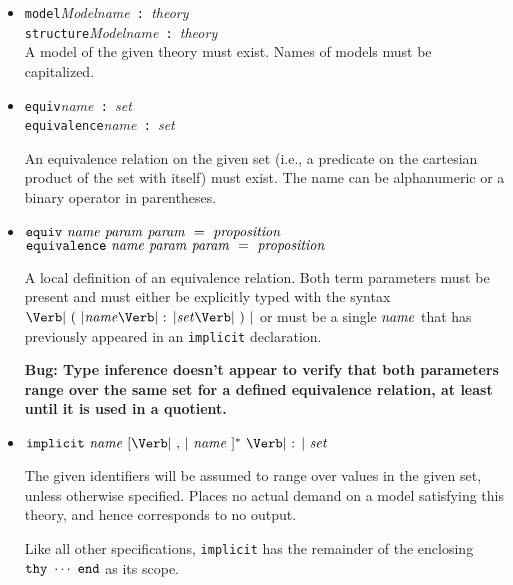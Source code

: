 \documentclass{article}
\newcommand{\keywd}[1]{\mbox{\texttt{#1}}\xspace}
\newcommand{\EQUIV}{\keywd{equiv}}
\newcommand{\EQUIVALENCE}{\keywd{equivalence}}
\newcommand{\END}{\keywd{end}}
\newcommand{\IMPLICIT}{\keywd{implicit}}
\newcommand{\MODEL}{\keywd{model}}
\newcommand{\STRUCTURE}{\keywd{structure}}
\newcommand{\THY}{\keywd{thy}}
\newcommand{\metav}[1]{\mbox{\textit{#1}}\xspace}
\newcommand{\Ident}{\metav{name}}
\newcommand{\Identifier}{\Ident}
\newcommand{\MIdentifier}{\metav{Modelname}}
\newcommand{\Setexp}{\metav{set}}
\newcommand{\Proposition}{\metav{proposition}}
\newcommand{\Param}{\metav{param}}
\newcommand{\Theoryexp}{\metav{theory}}
\newcommand{\COLON}{\mbox{\Verb| : |}}
\newcommand{\COMMA}{\mbox{\Verb| , |}}
\newcommand{\LPAREN}{\mbox{\Verb| ( |}}
\newcommand{\RPAREN}{\mbox{\Verb| ) |}}
\begin{document}
\begin{itemize}
      Each model parameter, if present, must be written
      with the syntax $\LPAREN \MIdentifier \COLON \Theoryexp \RPAREN$.
      Each term parameter, if present, must either be
      explicitly typed with the syntax $\LPAREN \Identifier \COLON 
      \Setexp \RPAREN$ or must be a single $\Identifier$ that has
      previously appeared in an \IMPLICIT declaration.

      \textbf{Need to change the parser so that model parameters are
      surrounded by parentheses as stated here, rather than 
      square brackets.}

\item \MODEL \MIdentifier \COLON \Theoryexp\\
      \STRUCTURE \MIdentifier \COLON \Theoryexp\\

      A model of the given theory must exist.  Names of models must be
      capitalized.

\item \EQUIV \Identifier \COLON \Setexp\\
      \EQUIVALENCE \Identifier \COLON \Setexp
  
  An equivalence relation on the given set (i.e., a predicate on the
  cartesian product of the set with itself) must exist.  The
  name can be alphanumeric or a binary operator in parentheses.

\item $\EQUIV\ \Identifier\ \Param\ \Param\ =\ \Proposition$\\
      $\EQUIVALENCE\ \Identifier\ \Param\ \Param\ =\ \Proposition$
 
  A local definition of an equivalence relation.  Both term parameters
  must be present and must either be explicitly typed with the syntax
  $\LPAREN \Identifier \COLON \Setexp \RPAREN$ or must be a single
  $\Identifier$ that has previously appeared in an \IMPLICIT
  declaration.  


  \textbf{Bug:  Type inference doesn't appear to verify that both parameters 
  range over the same set for a defined equivalence relation, at least
  until it is used in a quotient.}
  
\item $\IMPLICIT\ \Identifier\ [\COMMA\ \Identifier\ ]^*\ \COLON\ \Setexp$
  
  The given identifiers will be assumed to range over values in the
  given set, unless otherwise specified.  Places no actual demand
  on a model satisfying this theory, and hence corresponds to
  no output.  
  
  Like all other specifications, \IMPLICIT has the remainder of the
  enclosing $\THY\ \cdots\ \END$ as its scope.
\end{itemize}
\end{document}
